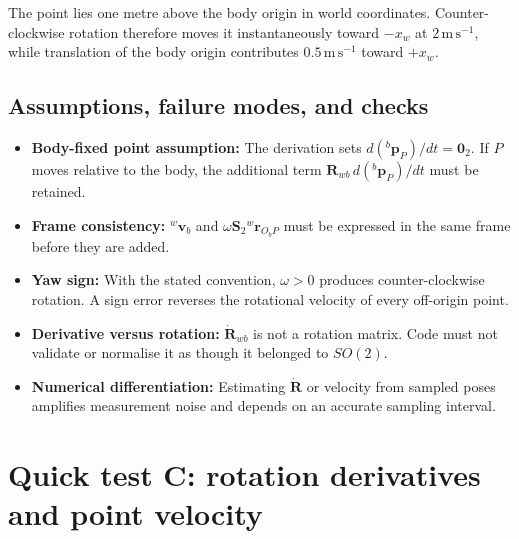 \documentclass[
  australian,
  12pt,
  letterpaper,
  DIV=11,
  numbers=noendperiod,
  twoside]{scrreprt}
\providecommand{\tightlist}{%
  \setlength{\itemsep}{0pt}\setlength{\parskip}{0pt}}
\begin{document}
The point lies one metre above the body origin in world coordinates.
Counter-clockwise rotation therefore moves it instantaneously toward
\(-x_w\) at \(2\,\mathrm{m\,s^{-1}}\), while translation of the body
origin contributes \(0.5\,\mathrm{m\,s^{-1}}\) toward \(+x_w\).

\subsection{Assumptions, failure modes, and
checks}\label{assumptions-failure-modes-and-checks}

\begin{itemize}
\tightlist
\item
  \textbf{Body-fixed point assumption:} The derivation sets
  \(d({}^{b}\mathbf p_P)/dt=\mathbf 0_2\). If \(P\) moves relative to
  the body, the additional term
  \(\mathbf R_{wb}\,d({}^{b}\mathbf p_P)/dt\) must be retained.
\item
  \textbf{Frame consistency:} \({}^{w}\mathbf v_b\) and
  \(\omega\mathbf S_2{}^{w}\mathbf r_{O_bP}\) must be expressed in the
  same frame before they are added.
\item
  \textbf{Yaw sign:} With the stated convention, \(\omega>0\) produces
  counter-clockwise rotation. A sign error reverses the rotational
  velocity of every off-origin point.
\item
  \textbf{Derivative versus rotation:} \(\dot{\mathbf R}_{wb}\) is not a
  rotation matrix. Code must not validate or normalise it as though it
  belonged to \(SO(2)\).
\item
  \textbf{Numerical differentiation:} Estimating \(\dot{\mathbf R}\) or
  velocity from sampled poses amplifies measurement noise and depends on
  an accurate sampling interval.
\end{itemize}

\section*{Quick test C: rotation derivatives and point
velocity}\label{quick-test-c-rotation-derivatives-and-point-velocity}

\end{document}
